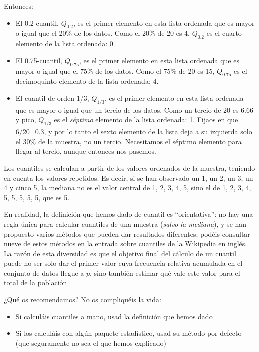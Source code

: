 \documentclass[
]{book}
\providecommand{\tightlist}{%
  \setlength{\itemsep}{0pt}\setlength{\parskip}{0pt}}
\theoremstyle{definition}
\theoremstyle{definition}
\theoremstyle{definition}
\theoremstyle{definition}
\theoremstyle{remark}
\begin{document}
Entonces:

\begin{itemize}
\item
  El 0.2-cuantil, \(Q_{0.2}\), es el primer elemento en esta lista ordenada que es mayor o igual que el 20\% de los datos. Como el 20\% de 20 es 4, \(Q_{0.2}\) es el cuarto elemento de la lista ordenada: 0.
\item
  El 0.75-cuantil, \(Q_{0.75}\), es el primer elemento en esta lista ordenada que es mayor o igual que el 75\% de los datos. Como el 75\% de 20 es 15, \(Q_{0.75}\) es el decimoquinto elemento de la lista ordenada: 4.
\item
  El cuantil de orden 1/3, \(Q_{1/3}\), es el primer elemento en esta lista ordenada que es mayor o igual que un tercio de los datos. Como un tercio de 20 es 6.66 y pico, \(Q_{1/3}\) es el \emph{séptimo} elemento de la lista ordenada: 1. Fijaos en que 6/20=0.3, y por lo tanto el sexto elemento de la lista deja a su izquierda solo el 30\% de la muestra, no un tercio. Necesitamos el séptimo elemento para llegar al tercio, aunque entonces nos pasemos.
\end{itemize}

\begin{rmdcuidado}
Los cuantiles se calculan a partir de los valores ordenados de la muestra, teniendo en cuenta los valores repetidos. Es decir, si se han observado un 1, un 2, un 3, un 4 y cinco 5, la mediana no es el valor central de 1, 2, 3, 4, 5, sino el de 1, 2, 3, 4, 5, 5, 5, 5, 5, que es 5.
\end{rmdcuidado}

\begin{rmdnote}
En realidad, la definición que hemos dado de cuantil es ``orientativa'': no hay una regla única para calcular cuantiles de una muestra (\emph{salvo la mediana}), y se han propuesto varios métodos que pueden dar resultados diferentes; podéis consultar nueve de estos métodos en la \href{https://en.wikipedia.org/wiki/Quantile\#Estimating_quantiles_from_a_sample}{entrada sobre cuantiles de la Wikipedia en inglés}. La razón de esta diversidad es que el objetivo final del cálculo de un cuantil puede no ser solo dar el primer valor cuya frecuencia relativa acumulada en el conjunto de datos llegue a \(p\), sino también estimar qué vale este valor para el total de la población.

¿Qué os recomendamos? No os compliquéis la vida:

\begin{itemize}
\tightlist
\item
  Si calculáis cuantiles a mano, usad la definición que hemos dado
\item
  Si los calculáis con algún paquete estadístico, usad su método por defecto (que seguramente no sea el que hemos explicado)
\end{itemize}
\end{rmdnote}
\end{document}
